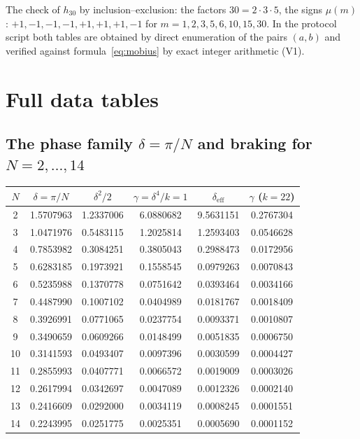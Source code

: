 The check of $h_{30}$ by inclusion--exclusion: the factors
$30=2\cdot3\cdot5$, the signs $\mu(m)$: $+1,-1,-1,-1,+1,+1,+1,-1$
for $m=1,2,3,5,6,10,15,30$. In the protocol script both tables are
obtained by direct enumeration of the pairs $(a,b)$ and verified
against formula~\eqref{eq:mobius} by exact integer arithmetic (V1).

\section{Full data tables}\label{app:fulldata}

\subsection{The phase family $\delta=\pi/N$ and braking for
$N=2,\dots,14$}

\begin{center}
\small
\begin{tabular}{@{}c c c c c c@{}}
\toprule
$N$ & $\delta=\pi/N$ & $\delta^2/2$ & $\gamma=\delta^4/k{=}1$ &
$\delta_{\mathrm{eff}}$ & $\gamma$ ($k=22$) \\
\midrule
2  & 1.5707963 & 1.2337006 & 6.0880682 & 9.5631151 & 0.2767304 \\
3  & 1.0471976 & 0.5483115 & 1.2025814 & 1.2593403 & 0.0546628 \\
4  & 0.7853982 & 0.3084251 & 0.3805043 & 0.2988473 & 0.0172956 \\
5  & 0.6283185 & 0.1973921 & 0.1558545 & 0.0979263 & 0.0070843 \\
6  & 0.5235988 & 0.1370778 & 0.0751642 & 0.0393464 & 0.0034166 \\
7  & 0.4487990 & 0.1007102 & 0.0404989 & 0.0181767 & 0.0018409 \\
8  & 0.3926991 & 0.0771065 & 0.0237754 & 0.0093371 & 0.0010807 \\
9  & 0.3490659 & 0.0609266 & 0.0148499 & 0.0051835 & 0.0006750 \\
10 & 0.3141593 & 0.0493407 & 0.0097396 & 0.0030599 & 0.0004427 \\
11 & 0.2855993 & 0.0407771 & 0.0066572 & 0.0019009 & 0.0003026 \\
12 & 0.2617994 & 0.0342697 & 0.0047089 & 0.0012326 & 0.0002140 \\
13 & 0.2416609 & 0.0292000 & 0.0034119 & 0.0008245 & 0.0001551 \\
14 & 0.2243995 & 0.0251775 & 0.0025351 & 0.0005690 & 0.0001152 \\
\bottomrule
\end{tabular}
\end{center}

